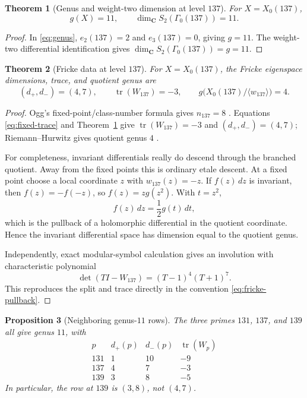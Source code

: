 \documentclass[11pt]{article}
\newtheorem{theorem}{Theorem}[section]
\newtheorem{proposition}[theorem]{Proposition}
\theoremstyle{definition}
\theoremstyle{remark}
\newcommand{\C}{\mathbf{C}}
\DeclareMathOperator{\tr}{tr}
\begin{document}
\begin{theorem}[Genus and weight-two dimension at level $137$]\label{thm:genus-137}
For $X=X_0(137)$,
\[
  g(X)=11,
  \qquad
  \dim_{\C}S_2(\Gamma_0(137))=11.
\]
\end{theorem}

\begin{proof}
In \eqref{eq:genus}, $e_2(137)=2$ and $e_3(137)=0$, giving $g=11$.
The weight-two differential identification gives
$\dim_{\C}S_2(\Gamma_0(137))=g=11$.
\end{proof}

\begin{theorem}[Fricke data at level $137$]\label{thm:fricke-137}
For $X=X_0(137)$, the Fricke eigenspace dimensions, trace, and quotient genus
are
\[
  (d_+,d_-)=(4,7), \qquad \tr(W_{137})=-3,
  \qquad g\bigl(X_0(137)/\langle w_{137}\rangle\bigr)=4.
\]
\end{theorem}

\begin{proof}
Ogg's fixed-point/class-number formula gives $n_{137}=8$
\cite[p.~454]{Ogg1974}.  Equations \eqref{eq:fixed-trace} and
Theorem~\ref{thm:genus-137} give $\tr(W_{137})=-3$ and
$(d_+,d_-)=(4,7)$; Riemann--Hurwitz gives quotient genus $4$
\cite{StacksRiemannHurwitz}.

For completeness, invariant differentials really do descend through the
branched quotient.  Away from the fixed points this is ordinary etale descent.
At a fixed point choose a local coordinate $z$ with $w_{137}(z)=-z$.  If
$f(z)\,dz$ is invariant, then $f(z)=-f(-z)$, so
$f(z)=z g(z^2)$.  With $t=z^2$,
\[
  f(z)\,dz=\frac{1}{2}g(t)\,dt,
\]
which is the pullback of a holomorphic differential in the quotient
coordinate.  Hence the invariant differential space has dimension equal to
the quotient genus.

Independently, exact modular-symbol calculation gives an involution with
characteristic polynomial
\[
  \det(TI-W_{137})=(T-1)^4(T+1)^7.
\]
This reproduces the split and trace directly in the convention
\eqref{eq:fricke-pullback}.
\end{proof}

\begin{proposition}[Neighboring genus-$11$ rows]\label{prop:neighbor-fricke-splits}
The three primes $131$, $137$, and $139$ all give genus $11$, with
\[
\begin{array}{c|ccc}
  p & d_+(p) & d_-(p) & \tr(W_p)\\
  \hline
  131 & 1 & 10 & -9\\
  137 & 4 & 7  & -3\\
  139 & 3 & 8  & -5
\end{array}
\]
In particular, the row at $139$ is $(3,8)$, not $(4,7)$.
\end{proposition}
\end{document}

